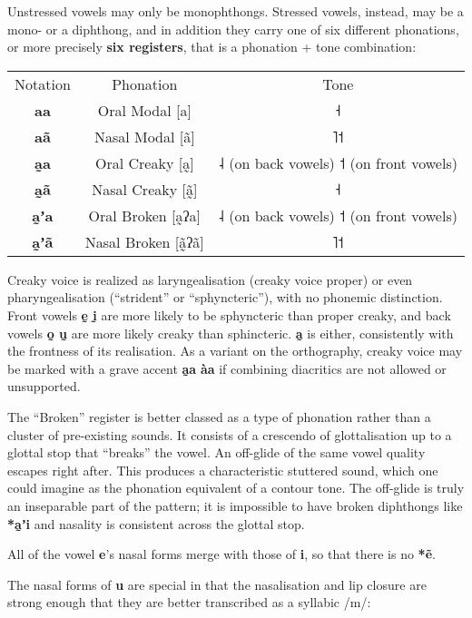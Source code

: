\documentclass[11pt,a5paper]{book}
\newcommand{\qcn}[1]{\textcolor{AccentText}{\large\textbf{#1}}}
\begin{document}
Unstressed vowels may only be monophthongs. Stressed vowels, instead, may be a mono- or a diphthong, and in addition they carry one of six different phonations, or more precisely \textbf{six registers}, that is a phonation + tone combination:

\begin{center}
\begin{tabular}{c c c}
	Notation & Phonation & Tone\\
	\qcn{aa} & Oral Modal [a] & ˧\\
	\qcn{aã} & Nasal Modal [ã] & ˥˦\\
	\qcn{a̰a} & Oral Creaky [a̰] & ˨ (on back vowels) ˦ (on front vowels)\\
	\qcn{a̰ã} & Nasal Creaky [ã̰]& ˧\\
	\qcn{a̰ʼa} & Oral Broken [a̰ʔa] & ˨ (on back vowels) ˦ (on front vowels)\\
	\qcn{a̰ʼã} & Nasal Broken [ã̰ʔã] & ˥˦ \\
\end{tabular}
\end{center}

Creaky voice is realized as laryngealisation (creaky voice proper) or even pharyngealisation (``strident'' or ``sphyncteric''), with no phonemic distinction. Front vowels \qcn{ḛ ḭ} are more likely to be sphyncteric than proper creaky, and back vowels \qcn{o̰ ṵ} are more likely creaky than sphincteric. \qcn{a̰} is either, consistently with the frontness of its realisation. As a variant on the orthography, creaky voice may be marked with a grave accent \qcn{a̰a} \textrightarrow{}\qcn{àa} if combining diacritics are not allowed or unsupported.

The ``Broken'' register is better classed as a type of phonation rather than a cluster of pre-existing sounds. It consists of a crescendo of glottalisation up to a glottal stop that ``breaks'' the vowel. An off-glide of the same vowel quality escapes right after. This produces a characteristic stuttered sound, which one could imagine as the phonation equivalent of a contour tone. The off-glide is truly an inseparable part of the pattern; it is impossible to have broken diphthongs like \qcn{*a̰ʼi} and nasality is consistent across the glottal stop.

All of the vowel \qcn{e}'s nasal forms merge with those of \qcn{i}, so that there is no \qcn{*ẽ}.

The nasal forms of \qcn{u} are special in that the nasalisation and lip closure are strong enough that they are better transcribed as a syllabic /m/:
\end{document}
